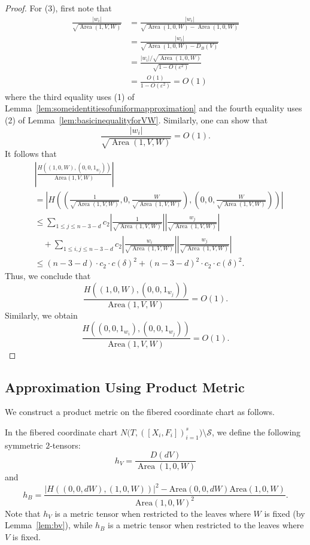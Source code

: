 \documentclass{compositio}
\numberwithin{equation}{section}
\numberwithin{figure}{section}
\theoremstyle{definition}
\theoremstyle{plain}
\begin{document}
{\begin{proof}
For (3), first note that
\begin{align*}
    \frac{|w_i|}{\sqrt{\operatorname{Area}(1,V,W)}} &= \frac{|w_i|}{\sqrt{\operatorname{Area}(1,0,W) - \operatorname{Area}(1,0,W)}} \\
    &= \frac{|w_i|}{\sqrt{\operatorname{Area}(1,0,W) - D_B(V)}}\\
    &= \frac{|w_i|/\sqrt{\operatorname{Area}(1,0,W)}}{\sqrt{1 - O(\varepsilon^2)}}\\
    &= \frac{O(1)}{1-O(\varepsilon^2)} = O(1)
\end{align*}
where the third equality uses (1) of Lemma~\ref{lem:someidentitiesofuniformapproximation} and the fourth equality uses (2) of Lemma~\ref{lem:basicinequalityforVW}.
Similarly, one can show that
$$
    \frac{|w_i|}{\sqrt{\operatorname{Area}(1,V,W)}}=O(1).
$$
It follows that
\begin{align*}
    &\left|\frac{H((1,0,W),(0,0,1_{w_j}))}{\mathrm{Area}(1,V,W)}\right| \\
    &= \left|H\left( \left(\frac{1}{\sqrt{\operatorname{Area}(1,V,W)}},0,\frac{W}{\sqrt{\operatorname{Area}(1,V,W)}}\right),\left(0,0,\frac{W}{\sqrt{\operatorname{Area}(1,V,W)}}\right)\right)\right|\\
    &\leq \sum_{1\leq j\leq n-3-d} c_2 \left|\frac{1}{\sqrt{\operatorname{Area}(1,V,W)}}\right| \left|\frac{w_j}{\sqrt{\operatorname{Area}(1,V,W)}}\right| \\
    &\quad + \sum_{1\leq i,j\leq n-3-d} c_2 \left|\frac{w_i}{\sqrt{\operatorname{Area}(1,V,W)}}\right| \left|\frac{w_j}{\sqrt{\operatorname{Area}(1,V,W)}}\right|\\
    &\leq (n-3-d)\cdot c_2\cdot c(\delta)^2 + (n-3-d)^2\cdot c_2\cdot c(\delta)^2.
\end{align*}
Thus, we conclude that 
$$
\frac{H((1,0,W),(0,0,1_{w_j}))}{\mathrm{Area}(1,V,W)} = O(1).
$$
Similarly, we obtain 
$$
\frac{H((0,0,1_{w_i}),(0,0,1_{w_j}))}{\mathrm{Area}(1,V,W)} = O(1).
$$
\end{proof}


\subsection{Approximation Using Product Metric}
We construct a product metric on the fibered coordinate chart as follows.

In the fibered coordinate chart $N\big(T, ([X_i, F_i])_{i=1}^s\big) \setminus \mathcal{S}$, we define the following symmetric $2$-tensors:
\begin{equation}\label{equ:hVmetric}
    h_V = \frac{D(dV)}{\operatorname{Area}(1,0,W)}
\end{equation}
and
\begin{equation}\label{equ:hBmetric}
    h_B =\frac{|H((0,0,dW),(1,0,W))|^2-\mathrm{Area}(0,0,dW)\mathrm{Area}(1,0,W)}{\mathrm{Area}(1,0,W)^2}.
\end{equation}
Note that $h_V$ is a metric tensor when restricted to the leaves where $W$ is fixed (by Lemma~\ref{lem:bv}), while $h_B$ is a metric tensor when restricted to the leaves where $V$ is fixed.

}
\end{document}
